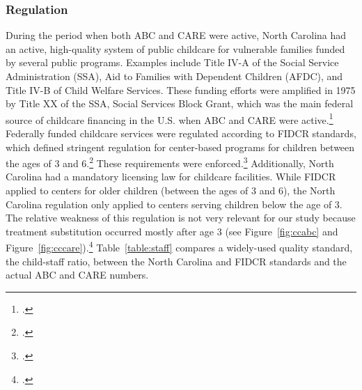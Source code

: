 \subsubsection{Regulation}  \label{appendix:tetanus}

\noindent During the period when both ABC and CARE were active, North Carolina had an active, high-quality system of public childcare for vulnerable families funded by several public programs. Examples include Title IV-A of the Social Service Administration (SSA), Aid to Families with Dependent Children (AFDC), and Title IV-B of Child Welfare Services. These funding efforts were amplified in 1975 by Title XX of the SSA, Social Services Block Grant, which was the main federal source of childcare financing in the U.S. when ABC and CARE were active.\footnote{\citet{Robins_1988_Federal-Child-Care}.}\\

\noindent Federally funded childcare services were regulated according to FIDCR standards, which defined stringent regulation for center-based programs for children between the ages of 3 and 6.\footnote{\citet{Department-of-Health_1968_DayCareRequirements}.} These requirements were enforced.\footnote{\citet{Kuperman_2015_Clifford-Russell-Interview}.} Additionally, North Carolina had a mandatory licensing law for childcare facilities. While FIDCR applied to centers for older children (between the ages of 3 and 6), the North Carolina regulation only applied to centers serving children below the age of 3. The relative weakness of this regulation is not very relevant for our study because treatment substitution occurred mostly after age 3 (see Figure~\ref{fig:ccabc} and Figure~\ref{fig:cccare}).\footnote{\citet{NCGA_1971_House-Bill-100}.} Table~\ref{table:staff} compares a widely-used quality standard, the child-staff ratio, between the North Carolina and FIDCR standards and the actual ABC and CARE numbers. \\

